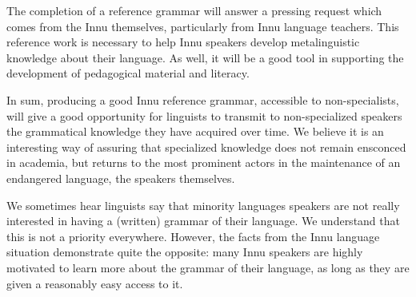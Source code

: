 The completion of a reference grammar will answer a pressing request which comes from the Innu themselves, particularly from Innu language teachers. This reference work is necessary to help Innu speakers develop metalinguistic knowledge about their language. As well, it will be a good tool in supporting the development of pedagogical material and literacy.

In sum, producing a good Innu reference grammar, accessible to non-specialists, will give a good opportunity for linguists to transmit to non-specialized speakers the grammatical knowledge they have acquired over time. We believe it is an interesting way of assuring that specialized knowledge does not remain ensconced in academia, but returns to the most prominent actors in the maintenance of an endangered language, the speakers themselves.

We sometimes hear linguists say that minority languages speakers are not really interested in having a (written) grammar of their language. We understand that this is not a priority everywhere. However, the facts from the Innu language situation demonstrate quite the opposite: many Innu speakers are highly motivated to learn more about the grammar of their language, as long as they are given a reasonably easy access to it. 

